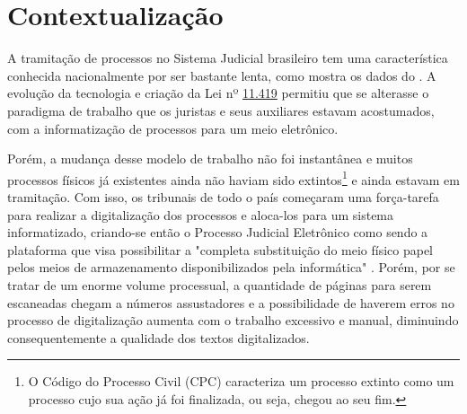 \chapter[Contextualização]{Contextualização}

A tramitação de processos no Sistema Judicial brasileiro tem uma característica conhecida nacionalmente por ser bastante lenta, como mostra os dados do . A evolução da tecnologia e criação da Lei nº \href{planalto.gov.br/ccivil_03/_ato2004-2006/2006/lei/l11419.htm}{11.419} permitiu que se alterasse o paradigma de trabalho que os juristas e seus auxiliares estavam acostumados, com a informatização de processos para um meio eletrônico.

Porém, a mudança desse modelo de trabalho não foi instantânea e muitos processos físicos já existentes ainda não haviam sido extintos\footnote{
    O Código do Processo Civil (CPC) caracteriza um processo extinto como um processo cujo sua ação já foi finalizada, ou seja, chegou ao seu fim.
} e ainda estavam em tramitação. Com isso, os tribunais de todo o país começaram uma força-tarefa para realizar a digitalização dos processos e aloca-los para um sistema informatizado, criando-se então o Processo Judicial Eletrônico como sendo a plataforma que visa possibilitar a "completa substituição do meio físico papel pelos meios de armazenamento disponibilizados pela informática" \cite{pje-e-sua-implantacao}. Porém, por se tratar de um enorme volume processual, a quantidade de páginas para serem escaneadas chegam a números assustadores e a possibilidade de haverem erros no processo de digitalização aumenta com o trabalho excessivo e manual, diminuindo consequentemente a qualidade dos textos digitalizados.

